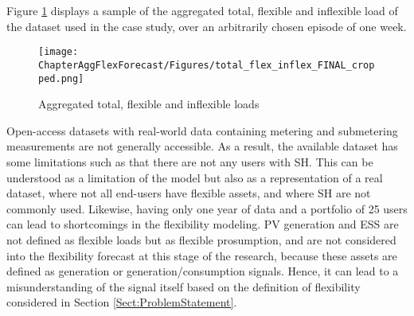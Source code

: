 Figure \ref{fig:agg_load} displays a sample of the aggregated total, flexible and inflexible load of the dataset used in the case study, over an arbitrarily chosen episode of one week. 

\begin{figure}[htbp]
\centerline{\texttt{[image: ChapterAggFlexForecast/Figures/total\_flex\_inflex\_FINAL\_cropped.png]}}
\caption{Aggregated total, flexible and inflexible loads}
\label{fig:agg_load}
\end{figure}

Open-access datasets with real-world data containing metering and submetering measurements are not generally accessible. As a result, the available dataset has some limitations such as that there are not any users with SH. This can be understood as a limitation of the model but also as a representation of a real dataset, where not all end-users have flexible assets, and where SH are not commonly used.  Likewise, having only one year of data and a portfolio of 25 users can lead to shortcomings in the flexibility modeling. PV generation and ESS are not defined as flexible loads but as flexible prosumption, and are not considered into the flexibility forecast at this stage of the research, because these assets are defined as generation or generation/consumption signals. Hence, it can lead to a misunderstanding of the signal itself based on the definition of flexibility considered in Section \ref{Sect:ProblemStatement}. 


